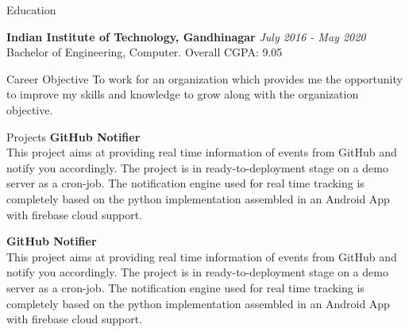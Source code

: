 \documentclass{resume} %
\begin{document}
\begin{rSection}{Education}


{\bf Indian Institute of Technology, Gandhinagar} \hfill {\em July 2016 - May 2020} 
\\ Bachelor of Engineering, Computer.\hfill { Overall CGPA: 9.05 }

\end{rSection}

\begin{rSection}{Career Objective}
 To work for an organization which provides me the opportunity to improve my skills and knowledge to grow along with the organization objective.
\end{rSection}

\begin{rSection}{Projects}
{\bf GitHub Notifier}
\\This project aims at providing real time information of events from GitHub and notify you accordingly. The project is in ready-to-deployment stage on a demo server as a cron-job. The notification engine  used for real time tracking is completely based on the python implementation assembled in an Android App with firebase cloud support.

{\bf GitHub Notifier}
\\This project aims at providing real time information of events from GitHub and notify you accordingly. The project is in ready-to-deployment stage on a demo server as a cron-job. The notification engine  used for real time tracking is completely based on the python implementation assembled in an Android App with firebase cloud support.

\end{rSection}
\end{document}
